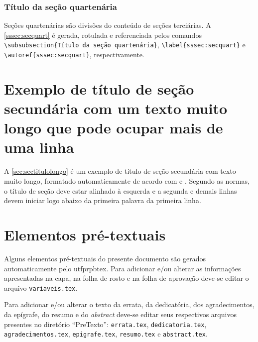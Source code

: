 \subsubsection{Título da seção quartenária}\label{sssec:secquart}

Seções quartenárias são divisões do conteúdo de seções terciárias. A \autoref{sssec:secquart} é gerada, rotulada e referenciada pelos comandos \verb|\subsubsection{Título da seção quartenária}|, \verb|\label{sssec:secquart}| e \verb|\autoref{sssec:secquart}|, respectivamente.

\section{Exemplo de título de seção secundária com um texto muito longo que pode ocupar mais de uma linha}\label{sec:sectitulolongo}

A \autoref{sec:sectitulolongo} é um exemplo de título de seção secundária com texto muito longo, formatado automaticamente de acordo com  e . Segundo as normas, o título de seção deve estar alinhado à esquerda e a segunda e demais linhas devem iniciar logo abaixo da primeira palavra da primeira linha.

\section{Elementos pré-textuais}\label{sec:elempretext}

Alguns elementos pré-textuais do presente documento são gerados automaticamente pelo \gls{utfprpbtex}. Para adicionar e/ou alterar as informações apresentadas na capa, na folha de rosto %
e na folha de aprovação deve-se editar o arquivo \texttt{variaveis.tex}. %

Para adicionar e/ou alterar o texto da errata, da dedicatória, dos agradecimentos, da epígrafe, do resumo e do \textit{abstract} deve-se editar seus respectivos arquivos presentes no diretório ``PreTexto'': \texttt{errata.tex}, \texttt{dedicatoria.tex}, \texttt{agradecimentos.tex}, \texttt{epigrafe.tex}, \texttt{resumo.tex} e \texttt{abstract.tex}.

